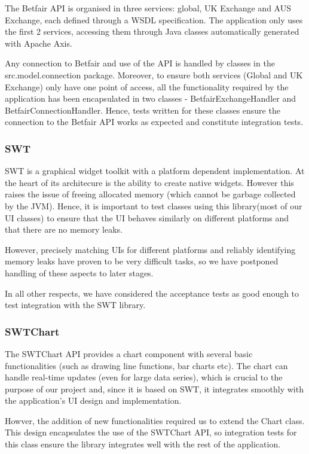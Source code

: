 \documentclass[10pt]{article}
\begin{document}
The Betfair API is organised in three services: global, UK Exchange and AUS Exchange, each defined through a WSDL specification. The application only uses the first 2 services, accessing them through Java classes automatically generated with Apache Axis.

Any connection to Betfair and use of the API is handled by classes in the src.model.connection package. Moreover, to ensure both services (Global and UK Exchange) only have one point of access, all the functionality required by the application has been encapsulated in two classes - BetfairExchangeHandler and BetfairConnectionHandler. Hence, tests written for these classes ensure the connection to the Betfair API works as expected and constitute integration tests.

\subsubsection{SWT}

SWT is a graphical widget toolkit with a platform dependent implementation. At the heart of its architecure is the ability to create native widgets. However this raises the issue of freeing allocated memory (which cannot be garbage collected by the JVM).
Hence, it is important to test classes using this library(most of our UI classes) to ensure that the UI behaves similarly on different platforms and that there are no memory leaks.

However, precisely matching UIs for different platforms and reliably identifying memory leaks have proven to be very difficult tasks, so we have postponed handling of these aspects to later stages.

In all other respects, we have considered the acceptance tests as good enough to test integration with the SWT library.

\subsubsection{SWTChart}

The SWTChart API provides a chart component with several basic functionalities (such as drawing line functions, bar charts etc). The chart can handle real-time updates (even for large data series), which is crucial to the purpose of our project and, since it is based on SWT, it integrates smoothly with the application's UI design and implementation. 

Howver, the addition of new functionalities required us to extend the Chart class. This design encapsulates the use of the SWTChart API, so integration tests for this class ensure the library integrates well with the rest of the application. 
\end{document}
